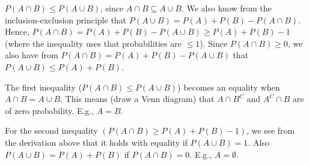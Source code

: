 
\setcounter{theorem}{42}

\begin{exercise}[BH.1.43]
\begin{solution}
	$P(A\cap B)\leq P(A\cup B)$, since $A\cap B\subseteq A\cup B$. We also know from the inclusion-exclusion principle that $P(A\cup B) = P(A) + P(B)-P(A\cap B)$. Hence, $P(A\cap B) = P(A)+P(B)-P(A\cup B)\geq P(A) + P(B)-1$ (where the inequality uses that probabilities are $\leq 1$). Since $P(A\cap B)\geq 0$, we also have from $P(A\cap B) = P(A)+P(B)-P(A\cup B)$ that $P(A\cup B)\leq P(A) + P(B)$.

	The first inequality ($P(A\cap B)\leq P(A\cup B)$) becomes an equality when $A\cap B= A\cup B$. This means (draw a Venn diagram) that $A\cap B^{C}$ and $A^{C}\cap B$ are of zero probability. E.g., $A=B$.

	For the second inequality $(P(A\cap B) \geq P(A) + P(B)-1)$, we see from the derivation above that it holds with equality if $P(A\cup B)=1$. Also $P(A\cup B)=P(A)+P(B)$ if $P(A\cap B)=0$. E.g., $A=\emptyset$.
\end{solution}
\end{exercise}

